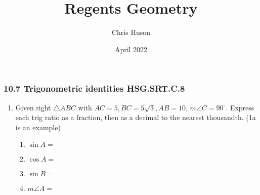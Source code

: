 \documentclass[12pt, twoside]{article}
\title{Regents Geometry}
\author{Chris Huson}
\date{April 2022}
\begin{document}
\subsubsection*{10.7 Trigonometric identities \hfill HSG.SRT.C.8}
\begin{enumerate}
\item Given right $\triangle ABC$ with $AC=5, BC=5 \sqrt{3}, AB=10$, $m\angle C=90^\circ$. Express each trig ratio as a fraction, then as a decimal to the nearest thousandth. (1a is an example)
  \begin{multicols}{2}
    \begin{enumerate}[itemsep=0.2cm]
      \item $\sin A =$
      \item $\cos A =$
      \item $\sin B =$
      \item $m\angle A=$
    \end{enumerate}
    \begin{center}
    \end{center}
  \end{multicols} \vspace{1cm}


\end{enumerate}
\end{document}
